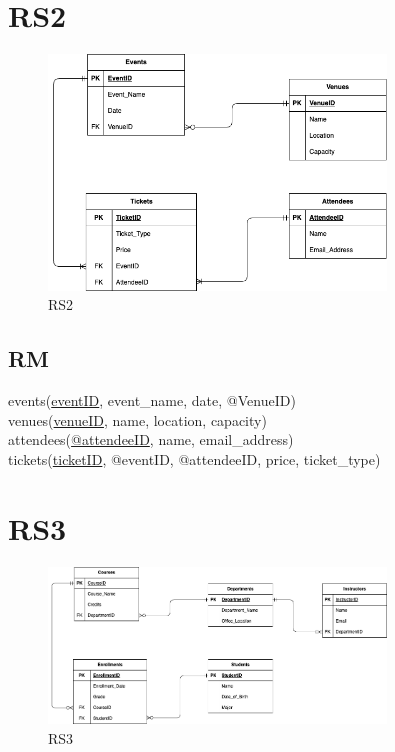 \documentclass{article}
\begin{document}
\begin{CJK*}{UTF8}{gbsn}
    \section{RS2}
    \begin{figure}[H]
        \centering
        \includegraphics[width=0.8\textwidth]{RS2.png}
        \caption{RS2}
    \end{figure}
    \subsection{RM}
    events(\underline{eventID}, event\_name, date, @VenueID)
    \\venues(\underline{venueID}, name, location, capacity)
    \\attendees(\underline{@attendeeID}, name, email\_address)
    \\tickets(\underline{ticketID}, @eventID, @attendeeID, price, ticket\_type)

    \section{RS3}
    \begin{figure}[H]
        \centering
        \includegraphics[width=0.8\textwidth]{RS3.png}
        \caption{RS3}
    \end{figure}

\end{CJK*}
\end{document}
